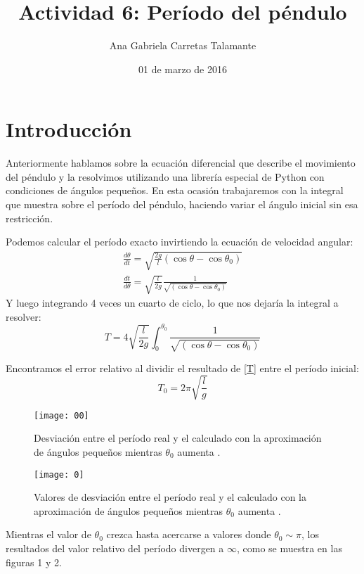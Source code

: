 \documentclass[12pt]{article}
\title{Actividad 6: Período del péndulo}
\author{Ana Gabriela Carretas Talamante}
\date{01 de marzo de 2016}
\begin{document}
\maketitle
\section{Introducción}
Anteriormente hablamos sobre la ecuación diferencial que describe el movimiento del péndulo y la resolvimos utilizando una librería especial de Python con condiciones de ángulos pequeños. En esta ocasión trabajaremos con la integral que muestra sobre el período del péndulo, haciendo variar el ángulo inicial sin esa restricción. \\

\begin{multicols}{2}
Podemos calcular el período exacto invirtiendo la ecuación de velocidad angular:
\begin{eqnarray}
\frac{d\theta}{dt}=\sqrt{\frac{2g}{l}(\cos{\theta}-\cos{\theta_0})} \\
\frac{dt}{d\theta}=\sqrt{\frac{l}{2g}}\frac{1}{\sqrt{(\cos{\theta}-\cos{\theta_0})}}
\end{eqnarray}
Y luego integrando 4 veces un cuarto de ciclo, lo que nos dejaría la integral a resolver:
\begin{equation}
\label{T}
T=4\sqrt{\frac{l}{2g}}\int_0^{\theta_0}\frac{1}{\sqrt{(\cos{\theta}-\cos{\theta_0})}}
\end{equation}

Encontramos el error relativo al dividir el resultado de \eqref{T} entre el período inicial:
\begin{equation}
\label{T0}
T_0=2\pi\sqrt{\frac{l}{g}}
\end{equation}

\begin{figure}[H]
\centering
\texttt{[image: 00]}
\caption{Desviación entre el período real y el calculado con la aproximación de ángulos pequeños mientras $\theta_0$ aumenta \cite{W}.}
\end{figure}
\end{multicols}

\begin{figure}[H]
\centering
\texttt{[image: 0]}
\caption{Valores de desviación entre el período real y el calculado con la aproximación de ángulos pequeños mientras $\theta_0$ aumenta \cite{P}. }
\end{figure}

Mientras el valor de $\theta_0$ crezca hasta acercarse a valores donde $\theta_0 \sim \pi$, los resultados del valor relativo del período divergen a $\infty$, como se muestra en las figuras 1 y 2. \\
\end{document}
